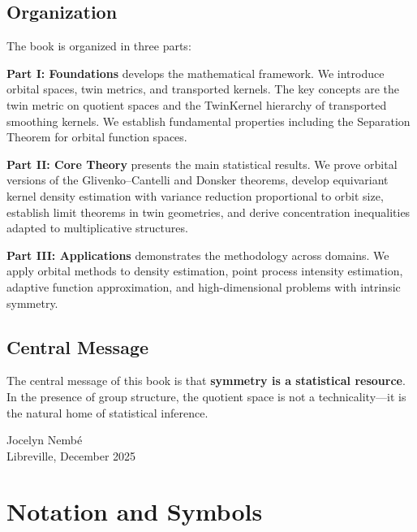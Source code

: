 \documentclass[11pt,twoside,openright]{book}
\theoremstyle{plain}
\theoremstyle{definition}
\theoremstyle{remark}
\begin{document}
\section*{Organization}

The book is organized in three parts:

\textbf{Part I: Foundations} develops the mathematical framework. We introduce orbital spaces, twin metrics, and transported kernels. The key concepts are the twin metric on quotient spaces and the TwinKernel hierarchy of transported smoothing kernels. We establish fundamental properties including the Separation Theorem for orbital function spaces.

\textbf{Part II: Core Theory} presents the main statistical results. We prove orbital versions of the Glivenko--Cantelli and Donsker theorems, develop equivariant kernel density estimation with variance reduction proportional to orbit size, establish limit theorems in twin geometries, and derive concentration inequalities adapted to multiplicative structures.

\textbf{Part III: Applications} demonstrates the methodology across domains. We apply orbital methods to density estimation, point process intensity estimation, adaptive function approximation, and high-dimensional problems with intrinsic symmetry.

\section*{Central Message}

The central message of this book is that \textbf{symmetry is a statistical resource}. In the presence of group structure, the quotient space is not a technicality---it is the natural home of statistical inference.

\vspace{1cm}
\begin{flushright}
Jocelyn Nembé\\
Libreville, December 2025
\end{flushright}

\tableofcontents

\chapter{Notation and Symbols}
\end{document}
